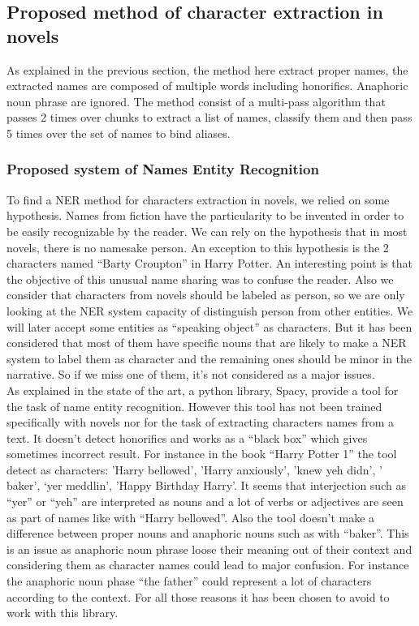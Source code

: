 \documentclass[a4paper, 12pt]{report}
\begin{document}
\subsection{Proposed method of character extraction in novels}
As explained in the previous section, the method here extract proper names, the extracted names are composed of multiple words including honorifics. 
Anaphoric noun phrase are ignored. 
The method consist of a multi-pass algorithm that passes 2 times over chunks to extract a list of names, classify them and then pass 5 times over the set of names to bind aliases.

\subsubsection{Proposed system of Names Entity Recognition}
\label{section:NER} 
To find a NER method for characters extraction in novels, we relied on some hypothesis. 
Names from fiction have the particularity to be invented in order to be easily recognizable by the reader. 
We can rely on the hypothesis that in most novels, there is no namesake person. An exception to this hypothesis is the 2 characters named ``Barty Croupton'' in Harry Potter. 
An interesting point is that the objective of this unusual name sharing was to confuse the reader. 
Also we consider that characters from novels should be labeled as person, so we are only looking at the  NER system capacity of distinguish person from other entities. 
We will later accept some entities as ``speaking object'' as characters. 
But it has been considered that most of them have specific nouns that are likely to make a NER system to label them as character 
and the remaining ones should be minor in the narrative. So if we miss one of them, it's not considered as a major issues.\\

As explained in the state of the art, a  python library, Spacy, provide a tool for the task of name entity recognition. 
However this tool has not been trained specifically with novels nor for the task of extracting characters names from a text. 
It doesn't detect honorifics and works as a ``black box'' which gives sometimes incorrect result. 
For instance in the book ``Harry Potter 1'' the tool detect as characters: 'Harry bellowed', 'Harry anxiously', 'knew yeh didn', ' baker', `yer meddlin', 'Happy Birthday Harry'. 
It seems that interjection such as ``yer'' or ``yeh'' are interpreted as nouns and  a lot of verbs or adjectives are seen as part of names like with ``Harry bellowed''. 
Also the tool doesn't make a difference between proper nouns and anaphoric nouns such as with ``baker''. 
This is an issue as anaphoric noun phrase loose their meaning out of their context and considering them as character names could lead to major confusion. 
For instance the anaphoric noun phase ``the father'' could represent a lot of characters according to the context. 
For all those reasons it has been chosen to avoid to work with this library. \\
\end{document}
